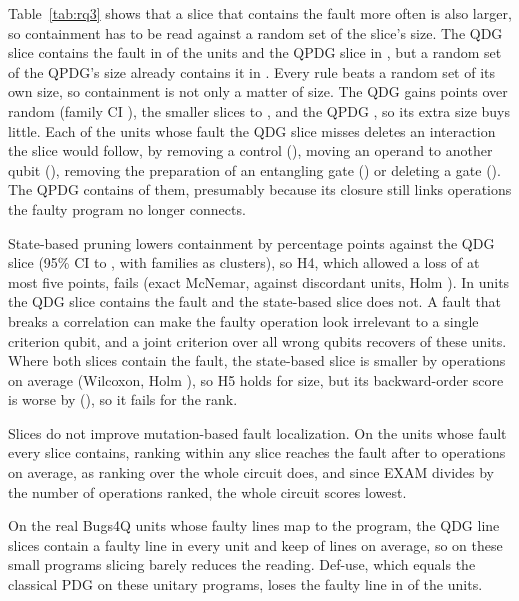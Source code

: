 Table~\ref{tab:rq3} shows that a slice that contains the fault more often is also larger, so containment has to be
read against a random set of the slice's size. The QDG slice contains the fault in \numRqThreeContainLc{} of the units
and the QPDG slice in \numRqThreeContainYz{}, but a random set of the QPDG's size already contains it in
\numSizeCtlYzRandom{}. Every rule beats a random set of its own size, so containment is not only a matter of size.
The QDG gains \numSizeCtlLcGain{} points over random (family CI \numSizeCtlLcGainCi{}), the smaller slices
\numSizeCtlCpdgGain{} to \numSizeCtlQGain{}, and the QPDG \numSizeCtlYzGain{}, so its extra size buys little. Each of
the \numLcMissTotal{} units whose fault the QDG slice misses deletes an interaction the slice would follow, by
removing a control (\numLcMissCrm{}), moving an operand to another qubit (\numLcMissQsw{}), removing the preparation
of an entangling gate (\numLcMissEnt{}) or deleting a gate (\numLcMissDel{}). The QPDG contains
\numLcMissYzContained{} of them, presumably because its closure still links operations the faulty program no longer
connects.

State-based pruning lowers containment by \numHFourDiffAbs{} percentage points against the QDG slice (95\% CI
\numHFourCILow{} to \numHFourCIHigh{}, \numCcHFour{} with families as clusters), so H4, which allowed a loss of at most
five points, fails (exact McNemar, \numHFourOnlyLc{} against \numHFourOnlyQ{} discordant units, Holm
\numHFourPHolm{}). In \numCQFour{} units the QDG slice contains the fault and the state-based slice does not. A fault that breaks a correlation can
make the faulty operation look irrelevant to a single criterion qubit, and a joint criterion over all wrong qubits
recovers \numCQFourRecovered{} of these units. Where both slices contain the fault, the state-based slice
is smaller by \numHFiveSizeDiff{} operations on average (Wilcoxon, Holm \numHFivePHolm{}), so H5 holds for size, but
its backward-order score is worse by \numHFiveExamQHigher{} (\numHFiveExamP{}), so it fails for the rank.

Slices do not improve mutation-based fault localization. On the \numMbflAllN{} units whose fault every slice contains,
ranking within any slice reaches the fault after \numMbflAllExaminedMin{} to \numMbflAllExaminedMax{} operations on
average, as ranking over the whole circuit does, and since EXAM divides by the number of operations ranked, the whole
circuit scores lowest.

On the \numLinesUnits{} real Bugs4Q units whose faulty lines map to the program, the QDG line slices contain a faulty
line in every unit and keep \numLinesLcMean{} of \numLinesFullMean{} lines on average, so on these small programs slicing barely reduces
the reading. Def-use, which equals the classical PDG on these unitary programs, loses the faulty line in
\numLinesDuMissed{} of the units.

